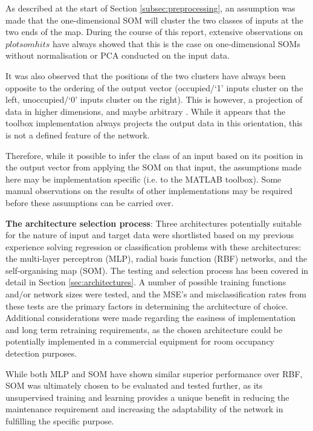 \documentclass[10pt, oneside]{article}
\begin{document}
As described at the start of Section \ref{subsec:preprocessing}, an assumption was made that the one-dimensional SOM will cluster the two classes of inputs at the two ends of the map. During the course of this report, extensive observations on $plotsomhits$ have always showed that this is the case on one-dimensional SOMs without normalisation or PCA conducted on the input data. 

It was also observed that the positions of the two clusters have always been opposite to the ordering of the output vector (occupied/`1' inputs cluster on the left, unoccupied/`0' inputs cluster on the right). This is however, a projection of data in higher dimensions, and maybe arbitrary \cite[p. 10]{som-app-lecture}. While it appears that the toolbox implementation always projects the output data in this orientation, this is not a defined feature of the network.

Therefore, while it possible to infer the class of an input based on its position in the output vector from applying the SOM on that input, the assumptions made here may be implementation specific (i.e. to the MATLAB toolbox). Some manual observations on the results of other implementations may be required before these assumptions can be carried over. 

\textbf{The architecture selection process}: Three architectures potentially suitable for the nature of input and target data were shortlisted based on my previous experience solving regression or classification problems with these architectures: the multi-layer perceptron (MLP), radial basis function (RBF) networks, and the self-organising map (SOM). The testing and selection process has been covered in detail in Section \ref{sec:architectures}. A number of possible training functions and/or network sizes were tested, and the MSE's and misclassification rates from these tests are the primary factors in determining the architecture of choice. Additional considerations were made regarding the easiness of implementation and long term retraining requirements, as the chosen architecture could be potentially implemented in a commercial equipment for room occupancy detection purposes. 

While both MLP and SOM have shown similar superior performance over RBF, SOM was ultimately chosen to be evaluated and tested further, as its unsupervised training and learning provides a unique benefit in reducing the maintenance requirement and increasing the adaptability of the network in fulfilling the specific purpose.
\end{document}
